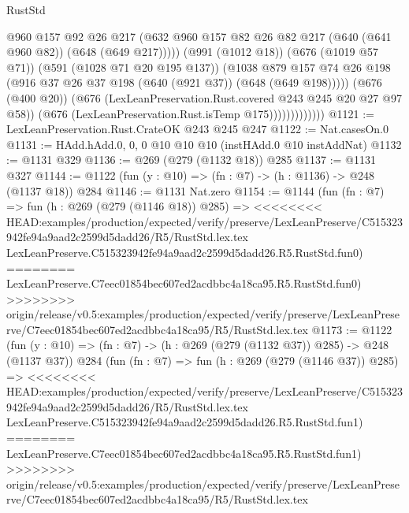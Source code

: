 \begin{lexlean}{RustStd}
\begin{coremodule}
{\begin{coremodule}
{{{{{{                                @960
                                @157
                                @92
                                @26
                                @217
                                (@632
                                  @960
                                  @157
                                  @82
                                  @26
                                  @82
                                  @217
                                  (@640 (@641 @960 @82))
                                  (@648 (@649 @217)))))
                            (@991 (@1012 @18))
                            (@676 (@1019 @57 @71))
                            (@591 (@1028 @71 @20 @195 @137))
                            (@1038
                              @879
                              @157
                              @74
                              @26
                              @198
                              (@916 @37 @26 @37 @198 (@640 (@921 @37)) (@648 (@649 @198)))))
                          (@676 (@400 @20))
                          (@676 (LexLeanPreservation.Rust.covered @243 @245 @20 @27 @97 @58))
                          (@676 (LexLeanPreservation.Rust.isTemp @175)))))))))))))
@1121 := LexLeanPreservation.Rust.CrateOK @243 @245 @247
@1122 := Nat.casesOn.{0}
@1131 := HAdd.hAdd.{0, 0, 0} @10 @10 @10 (instHAdd.{0} @10 instAddNat)
@1132 := @1131 @329
@1136 := @269 (@279 (@1132 @18)) @285
@1137 := @1131 @327
@1144 := @1122 (fun (y : @10) => (fn : @7) -> (h : @1136) -> @248 (@1137 @18)) @284
@1146 := @1131 Nat.zero
@1154 := @1144
    (fun (fn : @7) =>
    fun (h : @269 (@279 (@1146 @18)) @285) =>
<<<<<<<< HEAD:examples/production/expected/verify/preserve/LexLeanPreserve/C515323942fe94a9aad2c2599d5dadd26/R5/RustStd.lex.tex
    LexLeanPreserve.C515323942fe94a9aad2c2599d5dadd26.R5.RustStd.fun0)
========
    LexLeanPreserve.C7eec01854bec607ed2acdbbc4a18ca95.R5.RustStd.fun0)
>>>>>>>> origin/release/v0.5:examples/production/expected/verify/preserve/LexLeanPreserve/C7eec01854bec607ed2acdbbc4a18ca95/R5/RustStd.lex.tex
@1173 := @1122
    (fun (y : @10) => (fn : @7) -> (h : @269 (@279 (@1132 @37)) @285) -> @248 (@1137 @37))
    @284
    (fun (fn : @7) =>
    fun (h : @269 (@279 (@1146 @37)) @285) =>
<<<<<<<< HEAD:examples/production/expected/verify/preserve/LexLeanPreserve/C515323942fe94a9aad2c2599d5dadd26/R5/RustStd.lex.tex
    LexLeanPreserve.C515323942fe94a9aad2c2599d5dadd26.R5.RustStd.fun1)
========
    LexLeanPreserve.C7eec01854bec607ed2acdbbc4a18ca95.R5.RustStd.fun1)
>>>>>>>> origin/release/v0.5:examples/production/expected/verify/preserve/LexLeanPreserve/C7eec01854bec607ed2acdbbc4a18ca95/R5/RustStd.lex.tex
}}}}}}
\end{coremodule}}
\end{coremodule}
\end{lexlean}
